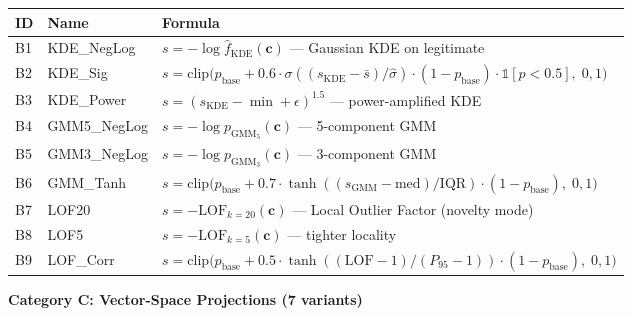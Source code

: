 \documentclass[
  11pt,
]{article}
\newcounter{none} %
\begin{document}
{\def\LTcaptype{none} %
\begin{longtable}[]{@{}
  >{\raggedright\arraybackslash}p{}
  >{\raggedright\arraybackslash}p{}
  >{\raggedright\arraybackslash}p{}@{}}
\toprule\noalign{}
\begin{minipage}[b]{\linewidth}\raggedright
ID
\end{minipage} & \begin{minipage}[b]{\linewidth}\raggedright
Name
\end{minipage} & \begin{minipage}[b]{\linewidth}\raggedright
Formula
\end{minipage} \\
\midrule\noalign{}
\endhead
\bottomrule\noalign{}
\endlastfoot
B1 & KDE\_NegLog & \(s = -\log \hat{f}_{\text{KDE}}(\mathbf{c})\) —
Gaussian KDE on legitimate \\
B2 & KDE\_Sig &
\(s = \text{clip}\big(p_{\text{base}} + 0.6 \cdot \sigma((s_{\text{KDE}}-\bar{s})/\hat{\sigma}) \cdot (1-p_{\text{base}}) \cdot \mathbb{1}[p<0.5],\; 0, 1\big)\) \\
B3 & KDE\_Power & \(s = (s_{\text{KDE}} - \min + \epsilon)^{1.5}\) —
power-amplified KDE \\
B4 & GMM5\_NegLog & \(s = -\log p_{\text{GMM}_5}(\mathbf{c})\) —
5-component GMM \\
B5 & GMM3\_NegLog & \(s = -\log p_{\text{GMM}_3}(\mathbf{c})\) —
3-component GMM \\
B6 & GMM\_Tanh &
\(s = \text{clip}\big(p_{\text{base}} + 0.7 \cdot \tanh((s_{\text{GMM}}-\text{med})/\text{IQR}) \cdot (1-p_{\text{base}}),\; 0, 1\big)\) \\
B7 & LOF20 & \(s = -\text{LOF}_{k=20}(\mathbf{c})\) — Local Outlier
Factor (novelty mode) \\
B8 & LOF5 & \(s = -\text{LOF}_{k=5}(\mathbf{c})\) — tighter locality \\
B9 & LOF\_Corr &
\(s = \text{clip}\big(p_{\text{base}} + 0.5 \cdot \tanh((\text{LOF}-1)/(P_{95}-1)) \cdot (1-p_{\text{base}}),\; 0, 1\big)\) \\
\end{longtable}
}

\textbf{Category C: Vector-Space Projections (7 variants)}
\end{document}
